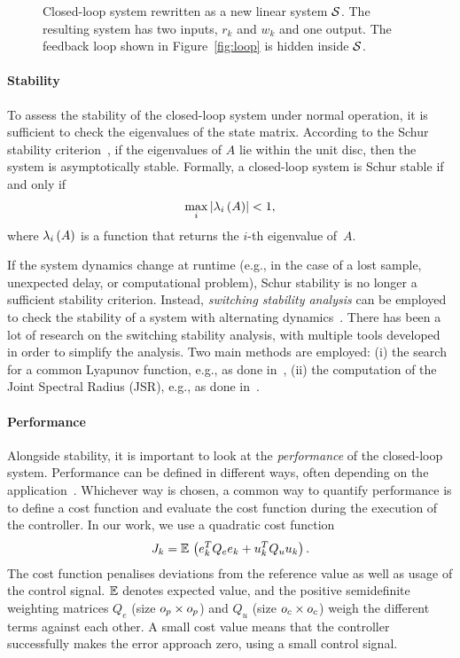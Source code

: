 \begin{figure}[t]
\centering

\caption{Closed-loop system rewritten as a new linear system $\mathcal{S}$.
    The resulting system has two inputs, $r_k$ and $w_k$ and one output.
    The feedback loop shown in Figure~\ref{fig:loop} is hidden inside $\mathcal{S}$.}
\label{fig:closedloop}
\end{figure}

\paragraph*{Stability}

To assess the stability of the closed-loop system under normal operation, it is sufficient to check the eigenvalues of the state matrix. 
According to the Schur stability criterion~\cite{Astrom:1997}, if the eigenvalues of $A$ lie within the unit disc, then the system is asymptotically stable. 
Formally, a closed-loop system is Schur stable if and only if
%
\begin{equation}
    \label{eq:schur}
    \max_i{\left|\lambda_{i}\left( A \right)\right|} < 1,
\end{equation}
%
where $\lambda_{i}\left( A \right)$ is a function that returns the $i$-th eigenvalue of~$A$.

If the system dynamics change at runtime (e.g., in the case of a lost sample, unexpected delay, or computational problem), Schur stability is no longer a sufficient stability criterion.
Instead, \emph{switching stability analysis} can be employed to check the stability of a system with alternating dynamics~\cite{Jungers2009}.
There has been a lot of research on the switching stability analysis, with multiple tools developed in order to simplify the analysis.
Two main methods are employed: (i) the search for a common Lyapunov function, e.g., as done in~\cite{Linsenmayer:2017}, (ii) the computation of the Joint Spectral Radius (JSR), e.g., as done in~\cite{Maggio:2020,Jungers:2014}.

\paragraph*{Performance}

Alongside stability, it is important to look at the \emph{performance} of the closed-loop system.
Performance can be defined in different ways, often depending on the application~\cite{Astrom:2006}.
Whichever way is chosen, a common way to quantify performance is to define a cost function and evaluate the cost function during the execution of the controller.
In our work, we use a quadratic cost function
%
\begin{equation}
    \label{eq:cost}
    J_k = \mathbb{E}\, \left(e_k^T Q_e e_k + u_k^T Q_u u_k\right).
\end{equation}
%
The cost function penalises deviations from the reference value as well as usage of the control signal.
$\mathbb{E}\, \!$ denotes expected value, and the positive semidefinite weighting matrices $Q_e$ (size $o_p \times o_p$) and $Q_u$ (size $o_c \times o_c$) weigh the different terms against each other.
A small cost value means that the controller successfully makes the error approach zero, using a small control signal.

